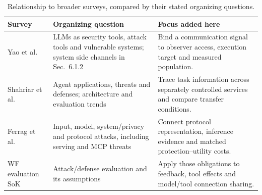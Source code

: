\begin{table}[t]\centering\small
\caption{Relationship to broader surveys, compared by their stated organizing questions.}
\label{tab:survey-position}
\setlength{\tabcolsep}{3pt}
\begin{tabularx}{\columnwidth}{@{}P{.23\columnwidth}YY@{}}\toprule
Survey & Organizing question & Focus added here \\\midrule
Yao et al.~\cite{yao2024survey} & LLMs as security tools, attack tools and vulnerable systems; system side channels in Sec.~6.1.2 & Bind a communication signal to observer access, execution target and measured population. \\\addlinespace[3pt]
Shahriar et al.~\cite{shahriar2025survey} & Agent applications, threats and defenses; architecture and evaluation trends & Trace task information across separately controlled services and compare transfer conditions. \\\addlinespace[3pt]
Ferrag et al.~\cite{ferrag2025survey} & Input, model, system/privacy and protocol attacks, including serving and MCP threats & Connect protocol representation, inference evidence and matched protection--utility costs. \\\addlinespace[3pt]
WF evaluation SoK~\cite{mathews2023critical} & Attack/defense evaluation and its assumptions & Apply those obligations to feedback, tool effects and model/tool connection sharing. \\\bottomrule
\end{tabularx}\end{table}
